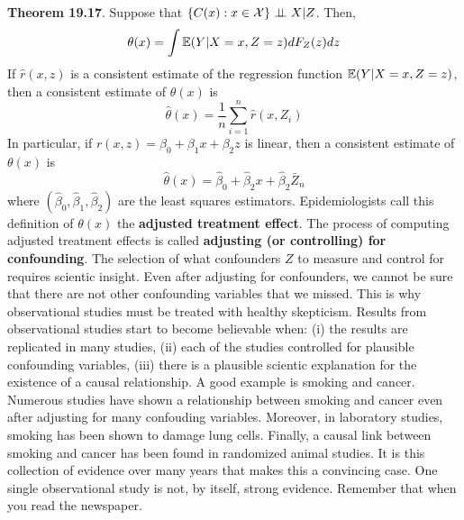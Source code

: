 \textbf{Theorem 19.17}. Suppose that $ \{ C(x) : x \in \mathcal{X} \}
\perp\!\!\!\perp X | Z$. Then,
\[
\theta(x) = \int \operatorname{\mathbb{E}}(Y | X = x, Z = z) d F_Z(z) dz
\]
If \(\hat{r}(x, z)\) is a consistent estimate of the regression function
\(\operatorname{\mathbb{E}}(Y | X = x, Z = z)\), then a consistent estimate of
\(\theta(x)\) is
\[
\hat{\theta}(x) = \frac{1}{n} \sum_{i=1}^{n} \hat{r}(x, Z_{i})
\]
In particular, if \(r(x, z) = \beta_{0} + \beta_{1} x + \beta_{2} z\) is
linear, then a consistent estimate of \(\theta(x)\) is
\[
\hat{\theta}(x) = \hat{\beta}_{0} + \hat{\beta}_{2} x + \hat{\beta}_{2} \bar{Z}_{n}
\]
where \((\hat{\beta}_{0}, \hat{\beta}_{1}, \hat{\beta}_{2})\) are the least
squares estimators.
Epidemiologists call this definition of \(\theta(x)\) the
\textbf{adjusted treatment effect}. The process of computing adjusted
treatment effects is called \textbf{adjusting (or controlling) for
confounding}. The selection of what confounders \(Z\) to measure and
control for requires scientic insight. Even after adjusting for
confounders, we cannot be sure that there are not other confounding
variables that we missed. This is why observational studies must be
treated with healthy skepticism. Results from observational studies
start to become believable when: (i) the results are replicated in many
studies, (ii) each of the studies controlled for plausible confounding
variables, (iii) there is a plausible scientic explanation for the
existence of a causal relationship.
A good example is smoking and cancer. Numerous studies have shown a
relationship between smoking and cancer even after adjusting for many
confouding variables. Moreover, in laboratory studies, smoking has been
shown to damage lung cells. Finally, a causal link between smoking and
cancer has been found in randomized animal studies. It is this
collection of evidence over many years that makes this a convincing
case. One single observational study is not, by itself, strong evidence.
Remember that when you read the newspaper.

